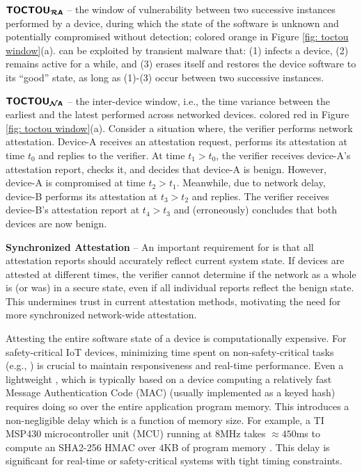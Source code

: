 \noindent $\boldsymbol{{\sf{ TOCTOU_{{\ensuremath{\sf{\mathcal RA}}}}}}}$ -- 
the window of vulnerability between two successive \ra instances performed by a device, 
during which the state of the software is unknown and potentially compromised without detection; 
colored orange in Figure \ref{fig: toctou window}(a). \toctoura can be exploited by 
transient malware that: (1) infects a device, (2) remains active for a 
while, and (3) erases itself and restores the device software to its ``good'' state, as 
long as (1)-(3) occur between two successive \ra instances.

\noindent $\boldsymbol{{\sf{ TOCTOU_{{\ensuremath{\sf{\mathcal NA}}}}}}}$ -- the inter-device \toctou window,
i.e., the time variance between the earliest and the latest \ra performed across networked
devices. colored red in Figure \ref{fig: toctou window}(a).
Consider a situation where, the verifier performs network attestation. Device-A receives an 
attestation request, performs its attestation at time $t_0$ and replies to the verifier.
At time $t_1>t_0$, the verifier receives device-A's attestation report, checks it, and decides that 
device-A is benign. However, device-A is compromised at time $t_2>t_1$. Meanwhile, due to network delay, device-B performs its attestation at $t_3>t_2$ and replies.
The verifier receives device-B's attestation report at $t_4>t_3$ and 
(erroneously) concludes that both devices are now benign. 


\noindent \textbf{Synchronized Attestation} -- An important requirement for \sa is 
that all attestation reports should accurately reflect current system state.
If devices are attested at different times, the verifier cannot determine 
if the network as a whole is (or was) in a secure state, even if all individual 
\ra reports reflect the benign state. This undermines trust in current attestation methods, 
motivating the need for more synchronized network-wide attestation.

Attesting the entire software state of a 
device is computationally expensive. For safety-critical IoT devices, 
minimizing time spent on non-safety-critical tasks (e.g., \ra) is crucial to 
maintain responsiveness and real-time performance. Even a lightweight \ra, 
which is typically based on a device computing a relatively fast Message Authentication Code (MAC) 
(usually implemented as a keyed hash) requires doing so over the entire application program memory.
This introduces a non-negligible delay which is a function of memory size. For example, a TI MSP430 
microcontroller unit (MCU) running at $8$MHz takes $\approx450$ms to compute an
SHA2-256 HMAC over $4$KB of program memory \cite{vrased}. 
This delay is significant for real-time or safety-critical systems with 
tight timing constraints. 

